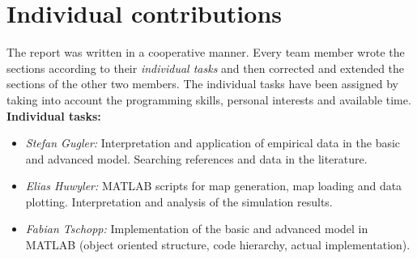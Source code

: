 \section{Individual contributions}
	The report was written in a cooperative manner. Every team member wrote the sections according to their \textit{individual tasks} and then corrected and extended the sections of the other two members. The individual tasks have been assigned by taking into account the programming skills, personal interests and available time.\\
	
	\textbf{Individual tasks:}
	\begin{itemize}
		\item \textit{Stefan Gugler:} Interpretation and application of empirical data in the basic and advanced model. Searching references and data in the literature.
		\item \textit{Elias Huwyler:} MATLAB scripts for map generation, map loading and data plotting. Interpretation and analysis of the simulation results.
		\item \textit{Fabian Tschopp:} Implementation of the basic and advanced model in MATLAB (object oriented structure, code hierarchy, actual implementation).
	\end{itemize}